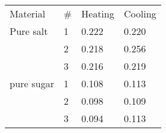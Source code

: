 \begin{tabular}{l l | l l}
Material & \# & Heating & Cooling\\
Pure salt & 1 & 0.222 & 0.220\\
& 2 & 0.218 & 0.256\\
& 3 & 0.216 & 0.219\\
pure sugar & 1 & 0.108 & 0.113\\
& 2 & 0.098 & 0.109\\
& 3 & 0.094 & 0.113\\
\end{tabular}
